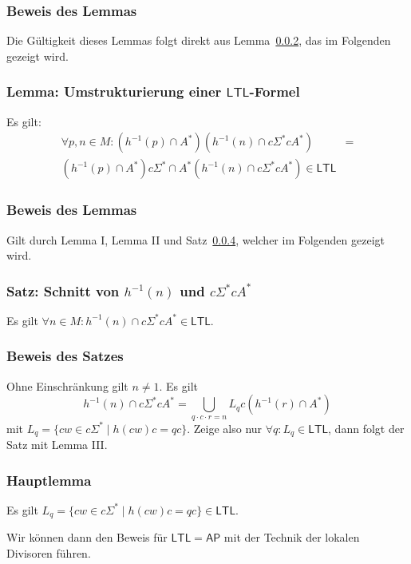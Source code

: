 \documentclass[12pt, german]{article}
\newcommand{\sigstern}{\Sigma^\ast}
\newcommand{\inv}{^{-1}}
\newcommand{\aast}{A^{\ast}}
\newcommand{\ap}{\mathsf{AP}}
\newcommand{\ltl}{\mathsf{LTL}}
\begin{document}
\subsubsection{Beweis des Lemmas}
	Die Gültigkeit dieses Lemmas folgt direkt aus Lemma~\ref{sec:ltl_pn}, das im Folgenden gezeigt wird.

\subsubsection{Lemma: Umstrukturierung einer $\ltl$-Formel}
	\label{sec:ltl_pn}
	Es gilt:
\begin{align*}
	\forall p, n \in M: (h\inv(p) \cap \aast)(h\inv(n) \cap c \sigstern c \aast) &= \\
	(h\inv(p) \cap \aast) c \sigstern \cap \aast(h\inv(n)\cap c \sigstern c \aast) \in \ltl 
	\end{align*}
\subsubsection{Beweis des Lemmas}
Gilt durch Lemma I, Lemma II und Satz~\ref{sec:ltl_hn}, welcher im Folgenden gezeigt wird.

\subsubsection{Satz: Schnitt von $h\inv (n)$ und $c \sigstern c \aast$}
\label{sec:ltl_hn}
	Es gilt $\forall n \in M : h\inv (n) \cap c \sigstern c \aast \in \ltl$.
	
\subsubsection{Beweis des Satzes}
	Ohne Einschränkung gilt $n \not = 1$.
	Es gilt $$h\inv(n) \cap c\sigstern c \aast = \bigcup_{q\cdot c\cdot r = n} L_q c (h\inv(r) \cap \aast) $$ mit $L_q = \{cw \in c \sigstern \mid h(cw)c = qc\}$. Zeige also nur $\forall q : L_q \in \ltl$, dann folgt der Satz mit Lemma III.

\subsubsection{Hauptlemma}
	Es gilt $L_q=\{cw \in c \sigstern \mid h(cw)c = qc\} \in \ltl$. \newline
	
	Wir können dann den Beweis für $\ltl = \ap$ mit der Technik der lokalen Divisoren führen. 
\end{document}
